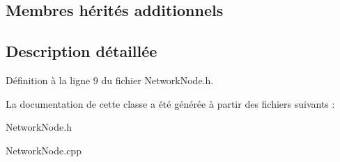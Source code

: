 \subsection*{Membres hérités additionnels}


\subsection{Description détaillée}


Définition à la ligne 9 du fichier Network\+Node.\+h.



La documentation de cette classe a été générée à partir des fichiers suivants \+:\begin{DoxyCompactItemize}
\item 
Network\+Node.\+h\item 
Network\+Node.\+cpp\end{DoxyCompactItemize}
